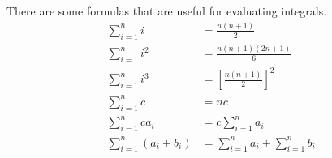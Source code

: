 \begin{frame}
There are some formulas that are useful for evaluating integrals.
\begin{align*}
\sum_{i=1}^n i & =  \frac{n(n+1)}{2}\\
\sum_{i=1}^n i^2 & =  \frac{n(n+1)(2n+1)}{6}\\
\sum_{i=1}^n i^3 & =  \left[\frac{n(n+1)}{2}\right]^2\\
\sum_{i=1}^n c & =  nc\\
\sum_{i=1}^n ca_i & =  c\sum_{i=1}^n a_i\\
\sum_{i=1}^n (a_i+b_i) & =  \sum_{i=1}^n a_i + \sum_{i=1}^n b_i
\end{align*}
\end{frame}
